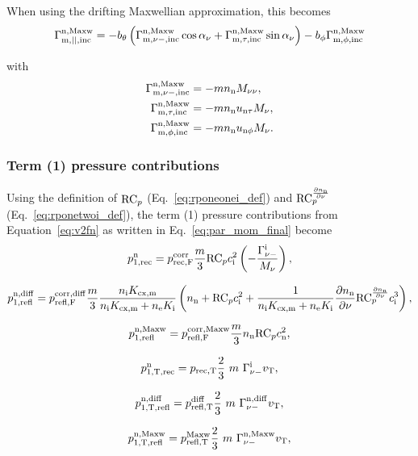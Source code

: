 When using the drifting Maxwellian approximation, this becomes
\begin{equation}
    \Gamma^{\mathrm{n,Maxw}}_{\mathrm{m,||,inc}} =  -\pit \left( \fmozincm \cosa + \fmoyincm \sina \right) - \pitt \fmoxincm
\end{equation}

with
\begin{align}
    \fmozincm & = - m \nn \itwol, \\
    \fmoyincm & = - m \nn \uyn \ionel, \\
    \fmoxincm & = - m \nn \uxn \ionel.
\end{align}

\subsubsection{Term (1) pressure contributions}

Using the definition of $\rponeonei$ (Eq.~\eqref{eq:rponeonei_def}) and $\rponetwoi$ (Eq.~\eqref{eq:rponetwoi_def}), the term (1) pressure contributions from Equation~\eqref{eq:v2fn} as written in Eq.~\eqref{eq:par_mom_final} become
\begin{equation}
     p^{\mathrm{n}}_{\mathrm{1,rec}} = \pcorfi \frac{m}{3} \rponeonei \ci^2 \left( - \frac{\fdni}{\ionel} \right),
\end{equation}

\begin{equation}
    p^{\mathrm{n,diff}}_{\mathrm{1,refl}} = \pcorfnd \frac{m}{3} \frac{\vcx}{\vtot} \left( \nn + \rponeonei \ci^2 + \frac{1}{\vtot} \dnndz \rponetwoi \ci^3 \right),
\end{equation}

\begin{equation}
    p^{\mathrm{n,Maxw}}_{\mathrm{1,refl}} = \pcorfnm \frac{m}{3} \nn \rponeonei \cn^2,
\end{equation}

\begin{equation}
    p^{\mathrm{n}}_{\mathrm{1,T,rec}} = \pti \frac{2}{3} \ m \ \fdni \vT ,
\end{equation}

\begin{equation}
    p^{\mathrm{n,diff}}_{\mathrm{1,T,refl}} = \ptnd \frac{2}{3} \ m \ \fnnid \vT ,
\end{equation}

\begin{equation}
    p^{\mathrm{n,Maxw}}_{\mathrm{1,T,refl}} = \ptnm \frac{2}{3} \ m \ \fnnim \vT ,
\end{equation}

